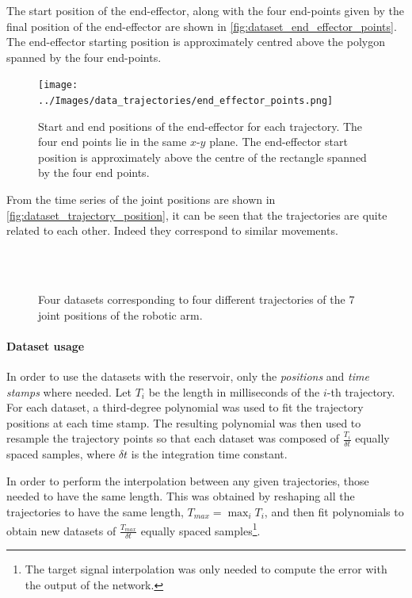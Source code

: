 \documentclass[10pt,a4paper, final]{report} %
\begin{document}
The start position of the end-effector, along with the four end-points given by the final position of the end-effector are shown in \autoref{fig:dataset_end_effector_points}. The end-effector starting position is approximately centred above the polygon spanned by the four end-points.

\begin{figure}[H]
\centering
\texttt{[image: ../Images/data\_trajectories/end\_effector\_points.png]}
\caption{Start and end positions of the end-effector for each trajectory. The four end points lie in the same $x$-$y$ plane. The end-effector start position is approximately above the centre of the rectangle spanned by the four end points.}
\label{fig:dataset_end_effector_points}
\end{figure}

From the time series of the joint positions are shown in \autoref{fig:dataset_trajectory_position}, it can be seen that the trajectories are quite related to each other. Indeed they correspond to similar movements.

\begin{figure}[H]
\\
\\
\caption{Four datasets corresponding to four different trajectories of the 7 joint positions of the robotic arm.}
\label{fig:dataset_trajectory_position}
\end{figure}

\paragraph{Dataset usage}
In order to use the datasets with the reservoir, only the \textit{positions} and \textit{time stamps} where needed. Let $T_i$ be the length in milliseconds of the $i$-th trajectory. For each dataset, a third-degree polynomial was used to fit the trajectory positions at each time stamp. The resulting polynomial was then used to resample the trajectory points so that each dataset was composed of $\frac{T_i}{\delta t}$ equally spaced samples, where $\delta t$ is the integration time constant.

In order to perform the interpolation between any given trajectories, those needed to have the same length. This was obtained by reshaping all the trajectories to have the same length, $T_{max} = \max_i T_i$, and then fit polynomials to obtain new datasets of $\frac{T_{max}}{\delta t}$ equally spaced samples\footnote{The target signal interpolation was only needed to compute the error with the output of the network.}.
\end{document}
